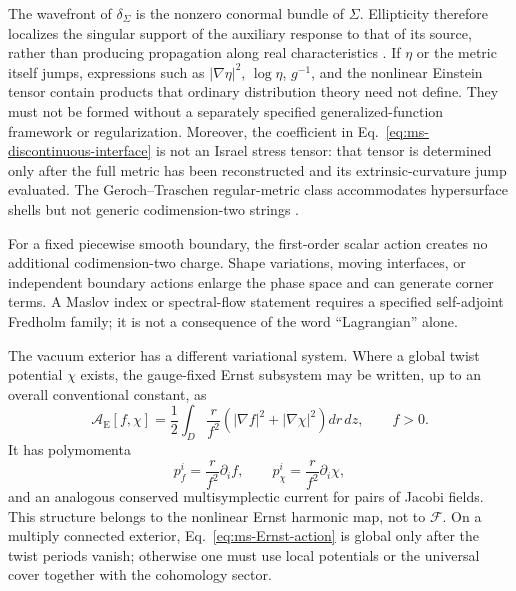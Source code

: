 The wavefront of $\delta_\Sigma$ is the nonzero conormal bundle of
$\Sigma$. Ellipticity therefore localizes the singular support of the
auxiliary response to that of its source, rather than producing propagation
along real characteristics \cite{Hormander2003ALPDOI}. If $\eta$ or the
metric itself jumps, expressions such as $|\nabla\eta|^2$, $\log\eta$,
$g^{-1}$, and the nonlinear Einstein tensor contain products that ordinary
distribution theory need not define. They must not be formed without a
separately specified generalized-function framework or regularization.
Moreover, the coefficient in Eq.~\eqref{eq:ms-discontinuous-interface} is
not an Israel stress tensor: that tensor is determined only after the full
metric has been reconstructed and its extrinsic-curvature jump evaluated.
The Geroch--Traschen regular-metric class accommodates hypersurface shells
but not generic codimension-two strings \cite{GerochTraschen1987PRD}.

For a fixed piecewise smooth boundary, the first-order scalar action creates
no additional codimension-two charge. Shape variations, moving interfaces,
or independent boundary actions enlarge the phase space and can generate
corner terms. A Maslov index or spectral-flow statement requires a specified
self-adjoint Fredholm family; it is not a consequence of the word
``Lagrangian'' alone.

The vacuum exterior has a different variational system. Where a global twist
potential $\chi$ exists, the gauge-fixed Ernst subsystem may be written, up
to an overall conventional constant, as
\begin{equation}
\mathcal A_{\mathrm E}[f,\chi]
=\frac12\int_D\frac r{f^2}
\left(|\nabla f|^2+|\nabla\chi|^2\right)dr\,dz,
\qquad f>0.
\label{eq:ms-Ernst-action}
\end{equation}
It has polymomenta
\begin{equation}
p_f^i=\frac r{f^2}\partial_i f,
\qquad
p_\chi^i=\frac r{f^2}\partial_i\chi,
\label{eq:ms-Ernst-polymomenta}
\end{equation}
and an analogous conserved multisymplectic current for pairs of Jacobi
fields. This structure belongs to the nonlinear Ernst harmonic map, not to
$\mathcal F$. On a multiply connected exterior, Eq.~\eqref{eq:ms-Ernst-action}
is global only after the twist periods vanish; otherwise one must use local
potentials or the universal cover together with the cohomology sector.

